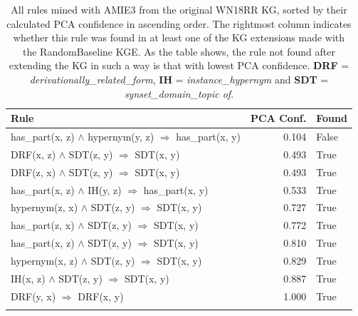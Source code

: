\begin{longtable}{lrl}
\toprule
                                                                                                      Rule &  PCA Conf. &  Found \\
\midrule
                                               has\_part(x, z) $\wedge$ hypernym(y, z)   $\Rightarrow$ has\_part(x, y) &           0.104 &                    False \\
DRF(x, z) $\wedge$ SDT(z, y)   $\Rightarrow$ SDT(x, y) &           0.493 &                     True \\
DRF(z, x) $\wedge$ SDT(z, y)   $\Rightarrow$ SDT(x, y) &           0.493 &                     True \\
                                      has\_part(x, z) $\wedge$ IH(y, z)   $\Rightarrow$ has\_part(x, y) &           0.533 &                     True \\
                   hypernym(z, x) $\wedge$ SDT(z, y)   $\Rightarrow$ SDT(x, y) &           0.727 &                     True \\
                   has\_part(z, x) $\wedge$ SDT(z, y)   $\Rightarrow$ SDT(x, y) &           0.772 &                     True \\
                   has\_part(x, z) $\wedge$ SDT(z, y)   $\Rightarrow$ SDT(x, y) &           0.810 &                     True \\
                   hypernym(x, z) $\wedge$ SDT(z, y)   $\Rightarrow$ SDT(x, y) &           0.829 &                     True \\
          IH(x, z) $\wedge$ SDT(z, y)   $\Rightarrow$ SDT(x, y) &           0.887 &                     True \\
                            DRF(y, x)   $\Rightarrow$ DRF(x, y) &           1.000 &                     True \\
\bottomrule
\caption{All rules mined with AMIE3 from the original WN18RR KG, sorted by their calculated PCA confidence in ascending order. The rightmost column indicates whether this rule was found in at least one of the KG extensions made with the RandomBaseline KGE. As the table shows, the rule not found after extending the KG in such a way is that with lowest PCA confidence. \textbf{DRF} = \textit{derivationally\_related\_form}, \textbf{IH} = \textit{instance\_hypernym} and \textbf{SDT} = \textit{synset\_domain\_topic of}.}
\label{original_rules_found_by_baseline_WN18RR}
\end{longtable}


